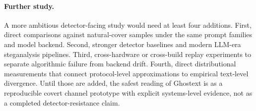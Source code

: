 \paragraph{Further study.} A more ambitious detector-facing study would need at least four additions. First, direct comparisons against natural-cover samples under the same prompt families and model backend. Second, stronger detector baselines and modern LLM-era steganalysis pipelines. Third, cross-hardware or cross-build replay experiments to separate algorithmic failure from backend drift. Fourth, direct distributional measurements that connect protocol-level approximations to empirical text-level divergence. Until those are added, the safest reading of Ghostext is as a reproducible covert channel prototype with explicit systems-level evidence, not as a completed detector-resistance claim.
